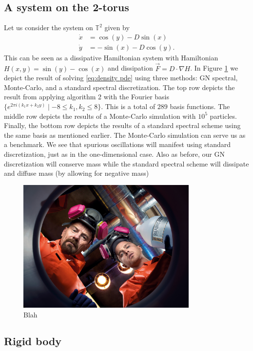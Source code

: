 \documentclass[12pt]{amsart}
\begin{document}
\subsection{A system on the 2-torus}
Let us consider the system on $\mathbb{T}^{2}$ given by 
\begin{align}
	\dot{x} &= \cos(y) - D \sin(x) \\
	\dot{y} &= -\sin(x) - D \cos(y).
\end{align}
This can be seen as a dissipative Hamiltonian system with Hamiltonian $H(x,y) = \sin(y) - \cos(x)$ and dissipation $\vec{F} = D \cdot \nabla H$.
In Figure \ref{fig:2 torus} we depict the result of solving \eqref{eq:density pde} using three methods: GN spectral, Monte-Carlo, and a standard spectral discretization.
The top row depicts the result from applying algorithm 2 with the Fourier basis $\{ e^{2\pi i (k_{1}x +k_{2}y)} \mid -8 \leq k_{1},k_{2} \leq 8\}$.
This is a total of $289$ basis functions. 
The middle row depicts the results of a Monte-Carlo simulation with $10^{5}$ particles.
Finally, the bottom row depicts the results of a standard spectral scheme using the same basis as mentioned earlier.
The Monte-Carlo simulation can serve us as a benchmark.
We see that spurious oscillations will manifest using standard discretization, just as in the one-dimensional case.
Also as before, our GN discretization will conserve mass while the standard spectral scheme will dissipate and diffuse mass (by allowing for negative mass)

\begin{figure}
	\centering
	\includegraphics[width=0.8\textwidth]{./images/placeholder}
	\caption{Blah}
	\label{fig:2 torus}
\end{figure}


\subsection{Rigid body}
\end{document}
